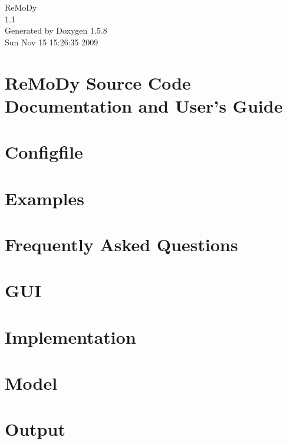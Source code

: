 \documentclass[a4paper]{book}
\begin{document}
\begin{titlepage}
\vspace*{7cm}
\begin{center}
{\Large ReMoDy \\[1ex]\large 1.1 }\\
\vspace*{1cm}
{\large Generated by Doxygen 1.5.8}\\
\vspace*{0.5cm}
{\small Sun Nov 15 15:26:35 2009}\\
\end{center}
\end{titlepage}
\clearemptydoublepage
{}
\tableofcontents
\clearemptydoublepage
{}
\chapter{ReMoDy Source Code Documentation and User's Guide}
\label{index}\hypertarget{index}{}
\chapter{Configfile}
\label{Configfile}
\hypertarget{Configfile}{}

\chapter{Examples}
\label{Examples}
\hypertarget{Examples}{}

\chapter{Frequently Asked Questions}
\label{FAQ}
\hypertarget{FAQ}{}

\chapter{GUI}
\label{GUI}
\hypertarget{GUI}{}

\chapter{Implementation}
\label{Implementation}
\hypertarget{Implementation}{}

\chapter{Model}
\label{Model}
\hypertarget{Model}{}

\chapter{Output}
\label{Output}
\hypertarget{Output}{}

\end{document}
